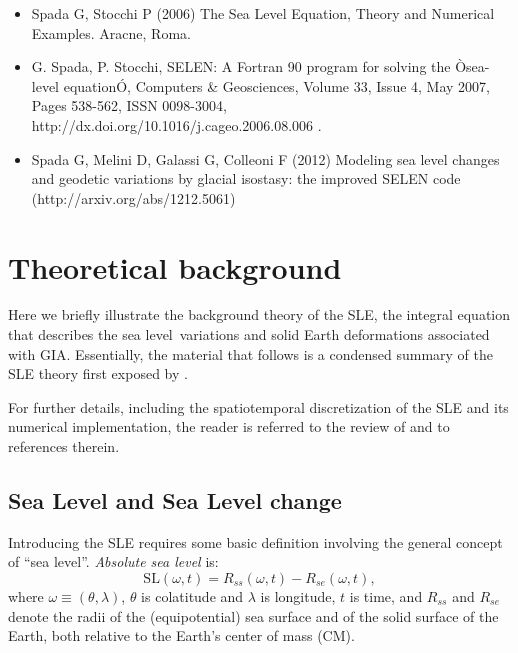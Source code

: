 \documentclass[11pt,fleqn,a4paper,titlepage]{article}
\newcommand\sealevel{sea level~}
\newcommand\sealevels{sea level}
\begin{document}
\begin{itemize}
\item Spada G, Stocchi P (2006) The Sea Level Equation, Theory and Numerical Examples. Aracne, Roma.
\item G. Spada, P. Stocchi, SELEN: A Fortran 90 program for solving the Òsea-level equationÓ, Computers \& Geosciences, Volume 33, Issue 4, May 2007, Pages 538-562, ISSN 0098-3004, http://dx.doi.org/10.1016/j.cageo.2006.08.006 .
\item Spada G, Melini D, Galassi G, Colleoni F (2012) Modeling sea level changes and geodetic variations by glacial isostasy: the improved SELEN code (http://arxiv.org/abs/1212.5061)
\end{itemize}

\clearpage

\section{Theoretical background}\label{sec:theory}

Here we briefly illustrate the background theory of the SLE, the integral equation that describes the \sealevel variations and solid Earth deformations associated with GIA. Essentially, the material that follows is a condensed summary of the SLE theory first exposed by \citet{Farrell_and_Clark_1976}. 

For further details, including the spatiotemporal discretization of the SLE and its  numerical implementation, the reader is referred to the review of \citet{Spada_and_Stocchi_2006} and to references therein. 

\subsection{Sea Level and Sea Level change}\label{sec:slc}

Introducing the SLE requires some basic definition involving the general concept of ``\sealevels''. 
\emph{Absolute \sealevels} is:
\begin{equation}\label{eq:sl-def}
\textrm{SL}(\omega,t) = R_{ss}(\omega,t) - R_{se}(\omega,t), 
\end{equation}
where $\omega\equiv (\theta,\lambda)$, $\theta$ is colatitude and $\lambda$ is longitude, $t$ is time, and
$R_{ss}$ and $R_{se}$ denote the radii of the (equipotential) sea surface and of the solid surface 
of the Earth, both relative to the Earth's center of mass (CM). 
\end{document}
